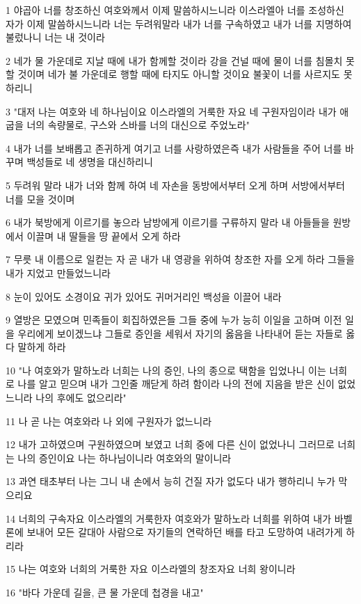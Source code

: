 \par 1 야곱아 너를 창조하신 여호와께서 이제 말씀하시느니라 이스라엘아 너를 조성하신 자가 이제 말씀하시느니라 너는 두려워말라 내가 너를 구속하였고 내가 너를 지명하여 불렀나니 너는 내 것이라
\par 2 네가 물 가운데로 지날 때에 내가 함께할 것이라 강을 건널 때에 물이 너를 침몰치 못할 것이며 네가 불 가운데로 행할 때에 타지도 아니할 것이요 불꽃이 너를 사르지도 못하리니
\par 3 "대저 나는 여호와 네 하나님이요 이스라엘의 거룩한 자요 네 구원자임이라 내가 애굽을 너의 속량물로, 구스와 스바를 너의 대신으로 주었노라"
\par 4 내가 너를 보배롭고 존귀하게 여기고 너를 사랑하였은즉 내가 사람들을 주어 너를 바꾸며 백성들로 네 생명을 대신하리니
\par 5 두려워 말라 내가 너와 함께 하여 네 자손을 동방에서부터 오게 하며 서방에서부터 너를 모을 것이며
\par 6 내가 북방에게 이르기를 놓으라 남방에게 이르기를 구류하지 말라 내 아들들을 원방에서 이끌며 내 딸들을 땅 끝에서 오게 하라
\par 7 무릇 내 이름으로 일컫는 자 곧 내가 내 영광을 위하여 창조한 자를 오게 하라 그들을 내가 지었고 만들었느니라
\par 8 눈이 있어도 소경이요 귀가 있어도 귀머거리인 백성을 이끌어 내라
\par 9 열방은 모였으며 민족들이 회집하였은들 그들 중에 누가 능히 이일을 고하며 이전 일을 우리에게 보이겠느냐 그들로 증인을 세워서 자기의 옳음을 나타내어 듣는 자들로 옳다 말하게 하라
\par 10 "나 여호와가 말하노라 너희는 나의 증인, 나의 종으로 택함을 입었나니 이는 너희로 나를 알고 믿으며 내가 그인줄 깨닫게 하려 함이라 나의 전에 지음을 받은 신이 없었느니라 나의 후에도 없으리라"
\par 11 나 곧 나는 여호와라 나 외에 구원자가 없느니라
\par 12 내가 고하였으며 구원하였으며 보였고 너희 중에 다른 신이 없었나니 그러므로 너희는 나의 증인이요 나는 하나님이니라 여호와의 말이니라
\par 13 과연 태초부터 나는 그니 내 손에서 능히 건질 자가 없도다 내가 행하리니 누가 막으리요
\par 14 너희의 구속자요 이스라엘의 거룩한자 여호와가 말하노라 너희를 위하여 내가 바벨론에 보내어 모든 갈대아 사람으로 자기들의 연락하던 배를 타고 도망하여 내려가게 하리라
\par 15 나는 여호와 너희의 거룩한 자요 이스라엘의 창조자요 너희 왕이니라
\par 16 "바다 가운데 길을, 큰 물 가운데 첩경을 내고"
